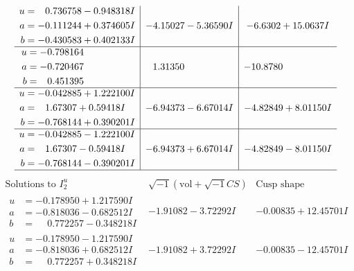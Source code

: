 \documentclass[1p]{elsarticle_modified}
\theoremstyle{definition}
\newcommand{\I}{\sqrt{-1}}
\begin{document}
$$\begin{array}{c|c|c}
\begin{aligned}
u &= \phantom{-}0.736758 - 0.948318 I \\
a &= -0.111244 + 0.374605 I \\
b &= -0.430583 + 0.402133 I\end{aligned}
 & -4.15027 - 5.36590 I & -6.6302 + 15.0637 I \\ \hline\begin{aligned}
u &= -0.798164\phantom{ +0.000000I} \\
a &= -0.720467\phantom{ +0.000000I} \\
b &= \phantom{-}0.451395\phantom{ +0.000000I}\end{aligned}
 & \phantom{-}1.31350\phantom{ +0.000000I} & -10.8780\phantom{ +0.000000I} \\ \hline\begin{aligned}
u &= -0.042885 + 1.222100 I \\
a &= \phantom{-}1.67307 + 0.59418 I \\
b &= -0.768144 + 0.390201 I\end{aligned}
 & -6.94373 - 6.67014 I & -4.82849 + 8.01150 I \\ \hline\begin{aligned}
u &= -0.042885 - 1.222100 I \\
a &= \phantom{-}1.67307 - 0.59418 I \\
b &= -0.768144 - 0.390201 I\end{aligned}
 & -6.94373 + 6.67014 I & -4.82849 - 8.01150 I\\
 \hline 
 \end{array}$$\newpage$$\begin{array}{c|c|c}  
\text{Solutions to }I^u_{2}& \I (\text{vol} + \sqrt{-1}CS) & \text{Cusp shape}\\
 \hline 
\begin{aligned}
u &= -0.178950 + 1.217590 I \\
a &= -0.818036 - 0.682512 I \\
b &= \phantom{-}0.772257 - 0.348218 I\end{aligned}
 & -1.91082 - 3.72292 I & -0.00835 + 12.45701 I \\ \hline\begin{aligned}
u &= -0.178950 - 1.217590 I \\
a &= -0.818036 + 0.682512 I \\
b &= \phantom{-}0.772257 + 0.348218 I\end{aligned}
 & -1.91082 + 3.72292 I & -0.00835 - 12.45701 I \\ \hline\begin{aligned}

\end{aligned}
\end{array}$$
\end{document}
